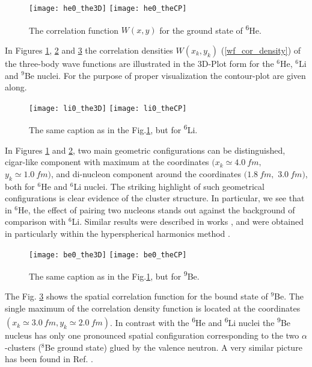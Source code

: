 \documentclass[
12pt, %
oneside, %
english, %
doublespacing, %
doublespacing, %
toctotoc, %
parskip, %
headsepline, %
]{MastersDoctoralThesis} %
\newcommand{\he}{\textsuperscript{6}He\xspace}
\newcommand{\li}{\textsuperscript{6}Li\xspace}
\newcommand{\be}{\textsuperscript{9}Be\xspace}
\begin{document}
 
\begin{figure}[tp]
\centering
\texttt{[image: he0\_the3D]}
\texttt{[image: he0\_theCP]}
\decoRule
\caption{  The correlation function $W(x ,y)$ for the ground state of \he.}
\label{fig:he0_the3D}
\end{figure}


In Figures \ref{fig:he0_the3D}, \ref{fig:li0_the3D} and \ref{fig:be0_the3D} the correlation densities $W(x_k,y_k)$ (\ref{wf_cor_density}) of the three-body wave functions are illustrated in the 3D-Plot form for the $^6$He,  $^6$Li and $^9$Be nuclei. For the purpose of proper visualization the contour-plot are given along. 

\begin{figure}[bp]
\centering
\texttt{[image: li0\_the3D]}
\texttt{[image: li0\_theCP]}
\decoRule
\caption{  The same caption as in the Fig.\ref{fig:he0_the3D}, but for \li.}
\label{fig:li0_the3D}
\end{figure} 

In Figures \ref{fig:he0_the3D} and \ref{fig:li0_the3D}, two main geometric configurations can be distinguished, cigar-like component with maximum at the coordinates $(x_k \simeq 4.0~ fm,$ $y_k \simeq 1.0~ fm)$, and di-nucleon component around the coordinates $(1.8~ fm,$ $3.0~ fm)$, both for $^6$He and  $^6$Li nuclei. 
The striking highlight of such geometrical configurations is clear evidence of the cluster structure. 
In particular, we see that in $^6$He, the effect of pairing two nucleons stands out against the background of comparison with $^6$Li. 
Similar results were described in works \cite{kukulin1977stochastic, papadimitriou2011charge}, and were obtained in particularly within the hyperspherical harmonics method \cite{zhukov1993bound}. 

\begin{figure}[tp]
\centering
\texttt{[image: be0\_the3D]}
\texttt{[image: be0\_theCP]}
\decoRule
\caption{  The same caption as in the Fig.\ref{fig:he0_the3D}, but for \be.}
\label{fig:be0_the3D}
\end{figure} 


The Fig. \ref{fig:be0_the3D} shows the spatial correlation function for the bound state of $^9$Be. 
The single maximum of the correlation density function is located at the coordinates $(x_k \simeq 3.0 ~fm, y_k \simeq 2.0~ fm)$. 
In contrast with the \he and \li nuclei the \be nucleus has only one pronounced spatial configuration corresponding to the two $\alpha$-clusters ($^8$Be ground state) glued by the valence neutron. A very similar picture has been found in Ref. \cite{hussein2015low}. 
\end{document}
